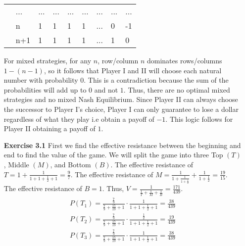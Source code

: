 \documentclass[10pt]{article}[H]
\begin{document}
\begin{itemize}
\begin{table}[H]
\begin{tabular}{lllllllll}
        \multicolumn{1}{l|}{}  & \multicolumn{1}{l|}{...} & \multicolumn{1}{l|}{...} & \multicolumn{1}{l|}{...} & \multicolumn{1}{l|}{...} & \multicolumn{1}{l|}{...} & \multicolumn{1}{l|}{...} & \multicolumn{1}{l|}{...} & \multicolumn{1}{l|}{...} \\ \cline{2-9} 
        \multicolumn{1}{l|}{}  & \multicolumn{1}{l|}{n}   & \multicolumn{1}{l|}{1}   & \multicolumn{1}{l|}{1}   & \multicolumn{1}{l|}{1}   & \multicolumn{1}{l|}{1}   & \multicolumn{1}{l|}{...} & \multicolumn{1}{l|}{0}   & \multicolumn{1}{l|}{-1}  \\ \cline{2-9} 
        \multicolumn{1}{l|}{}  & \multicolumn{1}{l|}{n+1} & \multicolumn{1}{l|}{1}   & \multicolumn{1}{l|}{1}   & \multicolumn{1}{l|}{1}   & \multicolumn{1}{l|}{1}   & \multicolumn{1}{l|}{...} & \multicolumn{1}{l|}{1}   & \multicolumn{1}{l|}{0}   \\ \cline{2-9} 
        \end{tabular}
        \end{table}
    For mixed strategies, for any $n$, row/column $n$ dominates rows/columns $1-(n-1)$, so it follows that Player I and II will choose each natural number with probability $0$. This is a contradiction because the sum of the probabilities will add up to $0$ and not $1$. Thus, there are no optimal mixed strategies and no mixed Nash Equilibrium. 
    Since Player II can always choose the successor to Player I's choice, Player I can only guarantee to lose a dollar regardless of what they play i.e obtain a payoff of $-1$. 
    This logic follows for Player II obtaining a payoff of $1$.
    \item [\textbf{Exercise 3.1}] First we find the effective resistance between the beginning and end to find the value of the game. We will split the game into three Top $(T)$, Middle $(M)$, and Bottom $(B)$. 
    The effective resistance of $T=1+\frac{1}{1+1+\frac{1}{2}+1}=\frac{9}{7}$. The effective resistance of $M=\frac{1}{1+\frac{1}{1+\frac{1}{2}}}+\frac{1}{1+\frac{1}{2}}=\frac{19}{15}$. The effective resistance of $B=1$. Thus, $V=\frac{1}{\frac{1}{T}+\frac{1}{M}+\frac{1}{B}}=\frac{171}{439}$.\\
    \begin{align*}
        P(T_1)=\frac{\frac{7}{9}}{\frac{7}{9}+\frac{15}{19}+1}\cdot\frac{1}{1+1+\frac{1}{2}+1}=\frac{38}{439}\\
        P(T_2)=\frac{\frac{7}{9}}{\frac{7}{9}+\frac{15}{19}+1}\cdot\frac{\frac{1}{2}}{1+1+\frac{1}{2}+1}=\frac{19}{439}\\
        P(T_3)=\frac{\frac{7}{9}}{\frac{7}{9}+\frac{15}{19}+1}\cdot\frac{1}{1+1+\frac{1}{2}+1}=\frac{38}{439}\\

\end{align*}
\end{itemize}
\end{document}
